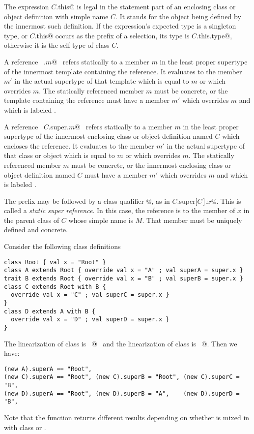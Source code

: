 The expression \lstinline@$C$.this@ is legal in the statement part of an
enclosing class or object definition with simple name $C$. It
stands for the object being defined by the innermost such definition.
If the expression's expected type is a singleton type, or
\lstinline@$C$.this@ occurs as the prefix of a selection, its type is
\lstinline@$C$.this.type@, otherwise it is the self type of class $C$.

A reference ~\lstinline@super.$m$@~ refers statically to a member $m$
in the least proper supertype of the innermost template containing the
reference.  It evaluates to the member $m'$ in the actual supertype of
that template which is equal to $m$ or which overrides $m$.  The
statically referenced member $m$ must be concrete, or the template
containing the reference must have a member $m'$ which overrides $m$
and which is labeled .  

A reference ~\lstinline@$C$.super.$m$@~ refers statically to a member
$m$ in the least proper supertype of the innermost enclosing class or
object definition named $C$ which encloses the reference. It evaluates
to the member $m'$ in the actual supertype of that class or object
which is equal to $m$ or which overrides $m$.  The statically
referenced member $m$ must be concrete, or the innermost enclosing
class or object definition named $C$ must have a member $m'$ which
overrides $m$ and which is labeled .

The  prefix may be followed by a class qualifier
\lstinline@[$C\,$]@, as in \lstinline@$C$.super[$C\,$].$x$@. This is
called a {\em static super reference}.  In this case, the reference is
to the member of $x$ in the parent class of $C$ whose simple
name is $M$. That member must be uniquely defined and concrete.

\example\label{ex:super}
Consider the following class definitions

\begin{lstlisting}
class Root { val x = "Root" }
class A extends Root { override val x = "A" ; val superA = super.x }
trait B extends Root { override val x = "B" ; val superB = super.x }
class C extends Root with B { 
  override val x = "C" ; val superC = super.x }
}
class D extends A with B {
  override val x = "D" ; val superD = super.x }
}
\end{lstlisting}
The linearization of class  is ~@~ and
the linearization of class  is ~@.
Then we have:
\begin{lstlisting}
(new A).superA == "Root", 
(new C).superA == "Root", (new C).superB = "Root", (new C).superC = "B",
(new D).superA == "Root", (new D).superB = "A",    (new D).superD = "B",
\end{lstlisting}
Note that the  function returns different results
depending on whether  is mixed in with class  or .

